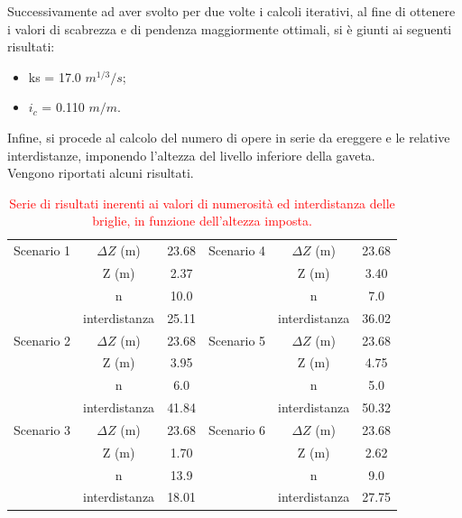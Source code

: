 Successivamente ad aver svolto per due volte i calcoli iterativi, al fine di ottenere i valori di scabrezza e di pendenza maggiormente ottimali, si è giunti ai seguenti risultati:
\begin{itemize}
    \item ks = 17.0 $m^{1/3}/s$;
    \item $i_c$ = 0.110 $m/m$.
\end{itemize}

Infine, si procede al calcolo del numero di opere in serie da ereggere e le relative interdistanze, imponendo l'altezza del livello inferiore della gaveta.\\
Vengono riportati alcuni risultati.
\begin{table}[H] \centering
    \caption{\textcolor{red}{Serie di risultati inerenti ai valori di numerosità ed interdistanza delle briglie, in funzione dell'altezza imposta.}}
    \begin{tabular}{ccc|ccc}
        \toprule
    Scenario 1 & $\Delta Z$ (m)& 23.68 & Scenario 4 & $\Delta Z$ (m) & 23.68 \\
& Z (m)         & 2.37  &            & Z (m)         & 3.40  \\
& n             & 10.0  &            & n             & 7.0   \\
& interdistanza & 25.11 &            & interdistanza & 36.02 \\
\midrule
Scenario 2 & $\Delta Z$ (m)        & 23.68 & Scenario 5 & $\Delta Z$ (m) & 23.68 \\
& Z (m)         & 3.95  &            & Z (m)         & 4.75  \\
& n             & 6.0   &            & n             & 5.0   \\
& interdistanza & 41.84 &            & interdistanza & 50.32 \\
    \midrule
Scenario 3 & $\Delta Z$ (m)        & 23.68 & Scenario 6 & $\Delta Z$ (m)        & 23.68 \\
& Z (m)         & 1.70  &            & Z (m)         & 2.62  \\
& n             & 13.9  &            & n             & 9.0   \\
& interdistanza & 18.01 &            & interdistanza & 27.75 \\
\bottomrule
\end{tabular}
\end{table}

